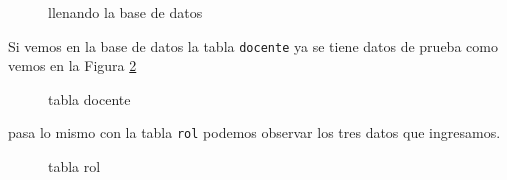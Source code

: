  \begin{figure}[H]
\caption{llenando la base de datos}\label{fig:populating}
\centering
{}
\end{figure}
Si vemos en la base de datos la tabla \texttt{docente} ya se tiene datos de prueba como vemos en la Figura \ref{fig:tableDocente}
\begin{figure}[H]
\caption{tabla docente}\label{fig:tableDocente}
\centering
{}
\end{figure}
pasa lo mismo con la tabla \texttt{rol} podemos observar los tres datos que ingresamos.
\begin{figure}[H]
\caption{tabla rol}\label{fig:tableRol}
\centering
{}
\end{figure}
